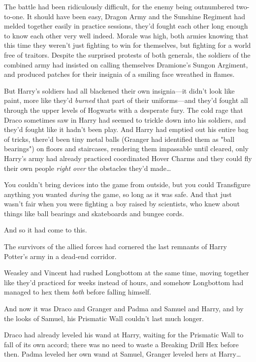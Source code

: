 The battle had been ridiculously difficult, for the enemy being outnumbered 
two-to-one. It should have been easy, Dragon Army and the Sunshine Regiment had 
melded together easily in practice sessions, they'd fought each other long 
enough to know each other very well indeed. Morale was high, both armies 
knowing that this time they weren't just fighting to win for themselves, but 
fighting for a world free of traitors. Despite the surprised protests of both 
generals, the soldiers of the combined army had insisted on calling themselves 
Dramione's Sungon Argiment, and produced patches for their insignia of a 
smiling face wreathed in flames.

But Harry's soldiers had all blackened their own insignia---it didn't look like 
paint, more like they'd \emph{burned} that part of their uniforms---and they'd 
fought all through the upper levels of Hogwarts with a desperate fury. The cold 
rage that Draco sometimes saw in Harry had seemed to trickle down into his 
soldiers, and they'd fought like it hadn't been play. And Harry had emptied out 
his entire bag of tricks, there'd been tiny metal balls (Granger had identified 
them as "ball bearings") on floors and staircases, rendering them impassable 
until cleared, only Harry's army had already practiced coordinated Hover Charms 
and they could fly their own people \emph{right over} the obstacles they'd 
made{\ldots}

You couldn't bring devices into the game from outside, but you could 
Transfigure anything you wanted \emph{during} the game, so long as it was safe. 
And that just wasn't fair when you were fighting a boy raised by scientists, 
who knew about things like ball bearings and skateboards and bungee cords.

And so it had come to this.

The survivors of the allied forces had cornered the last remnants of Harry 
Potter's army in a dead-end corridor.

Weasley and Vincent had rushed Longbottom at the same time, moving together 
like they'd practiced for weeks instead of hours, and somehow Longbottom had 
managed to hex them \emph{both} before falling himself.

And now it was Draco and Granger and Padma and Samuel and Harry, and by the 
looks of Samuel, his Prismatic Wall couldn't last much longer.

Draco had already leveled his wand at Harry, waiting for the Prismatic Wall to 
fall of its own accord; there was no need to waste a Breaking Drill Hex before 
then. Padma leveled her own wand at Samuel, Granger leveled hers at 
Harry{\ldots}

